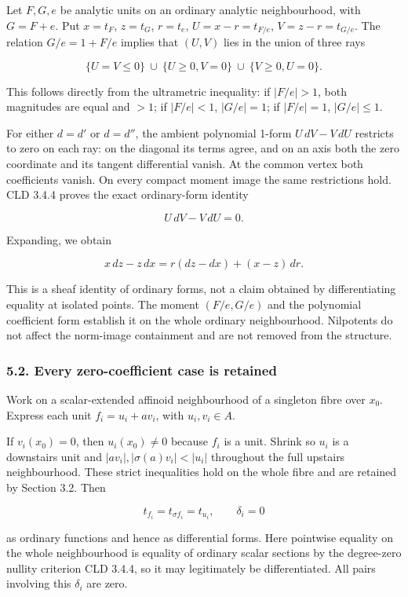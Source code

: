 \documentclass[
  11pt,
]{article}
\begin{document}
Let \(F,G,e\) be analytic units on an ordinary analytic neighbourhood,
with \(G=F+e\). Put \(x=t_F\), \(z=t_G\), \(r=t_e\), \(U=x-r=t_{F/e}\),
\(V=z-r=t_{G/e}\). The relation \(G/e=1+F/e\) implies that \((U,V)\)
lies in the union of three rays

\[\{U=V\leq0\}\ \cup\ \{U\geq0,V=0\}\ \cup\ \{V\geq0,U=0\}. \tag{6}\]

This follows directly from the ultrametric inequality: if \(|F/e|>1\),
both magnitudes are equal and \(>1\); if \(|F/e|<1\), \(|G/e|=1\); if
\(|F/e|=1\), \(|G/e|\leq1\).

For either \(d=d'\) or \(d=d''\), the ambient polynomial 1-form
\(U\,dV-V\,dU\) restricts to zero on each ray: on the diagonal its terms
agree, and on an axis both the zero coordinate and its tangent
differential vanish. At the common vertex both coefficients vanish. On
every compact moment image the same restrictions hold. CLD 3.4.4 proves
the exact ordinary-form identity

\[ U\,dV-V\,dU=0.\]

Expanding, we obtain

\[ x\,dz-z\,dx=r(dz-dx)+(x-z)\,dr. \tag{7}\]

This is a sheaf identity of ordinary forms, not a claim obtained by
differentiating equality at isolated points. The moment \((F/e,G/e)\)
and the polynomial coefficient form establish it on the whole ordinary
neighbourhood. Nilpotents do not affect the norm-image containment and
are not removed from the structure.

\subsubsection{5.2. Every zero-coefficient case is
retained}\label{every-zero-coefficient-case-is-retained}

Work on a scalar-extended affinoid neighbourhood of a singleton fibre
over \(x_0\). Express each unit \(f_i=u_i+av_i\), with \(u_i,v_i\in A\).

If \(v_i(x_0)=0\), then \(u_i(x_0)\ne0\) because \(f_i\) is a unit.
Shrink so \(u_i\) is a downstairs unit and
\(|av_i|,|\sigma(a)v_i|<|u_i|\) throughout the full upstairs
neighbourhood. These strict inequalities hold on the whole fibre and are
retained by Section 3.2. Then

\[t_{f_i}=t_{\sigma f_i}=t_{u_i},\qquad\delta_i=0 \tag{8}\]

as ordinary functions and hence as differential forms. Here pointwise
equality on the whole neighbourhood is equality of ordinary scalar
sections by the degree-zero nullity criterion CLD 3.4.4, so it may
legitimately be differentiated. All pairs involving this \(\delta_i\)
are zero.
\end{document}
